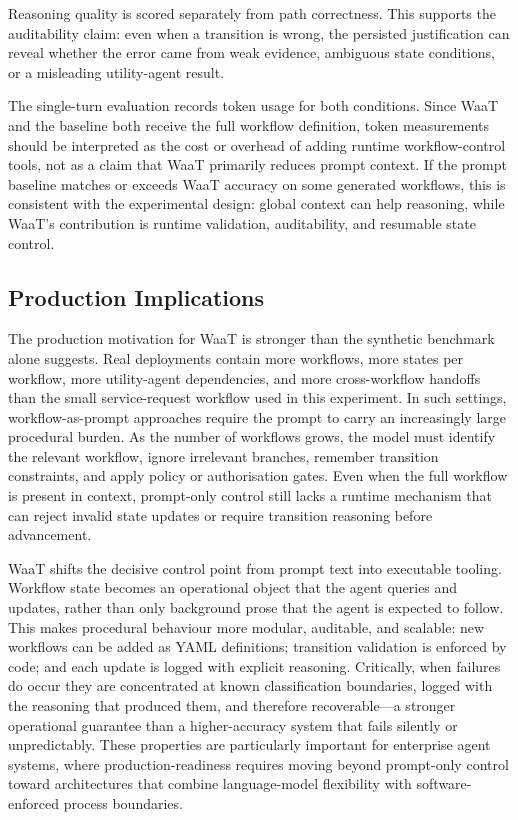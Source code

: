 \documentclass[10pt,conference]{IEEEtran}
\begin{document}
Reasoning quality is scored separately from path correctness.  This
supports the auditability claim: even when a transition is wrong,
the persisted justification can reveal whether the error came from
weak evidence, ambiguous state conditions, or a misleading
utility-agent result.

The single-turn evaluation records token usage for both conditions.
Since WaaT and the baseline both receive the full workflow
definition, token measurements should be interpreted as the cost or
overhead of adding runtime workflow-control tools, not as a claim
that WaaT primarily reduces prompt context.  If the prompt baseline
matches or exceeds WaaT accuracy on some generated workflows, this
is consistent with the experimental design: global context can help
reasoning, while WaaT's contribution is runtime validation,
auditability, and resumable state control.

\subsection{Production Implications}

The production motivation for WaaT is stronger than the synthetic
benchmark alone suggests.  Real deployments contain more
workflows, more states per workflow, more utility-agent
dependencies, and more cross-workflow handoffs than the small
service-request workflow used in this experiment.  In such
settings, workflow-as-prompt approaches require the prompt to
carry an increasingly large procedural burden.  As the number of
workflows grows, the model must identify the relevant workflow,
ignore irrelevant branches, remember transition constraints, and
apply policy or authorisation gates.  Even when the full workflow
is present in context, prompt-only control still lacks a runtime
mechanism that can reject invalid state updates or require
transition reasoning before advancement.

WaaT shifts the decisive control point from prompt text into
executable tooling.  Workflow state becomes an operational object
that the agent queries and updates, rather than only background
prose that the agent is expected to follow.  This makes procedural
behaviour more modular, auditable, and scalable: new workflows can
be added as YAML definitions; transition validation is enforced by
code; and each update is logged with explicit reasoning.
Critically, when failures do occur they are concentrated at known
classification boundaries, logged with the reasoning that produced
them, and therefore recoverable---a stronger operational guarantee
than a higher-accuracy system that fails silently or
unpredictably.  These properties are particularly important for
enterprise agent systems, where production-readiness requires
moving beyond prompt-only control toward architectures that
combine language-model flexibility with software-enforced process
boundaries.
\end{document}
